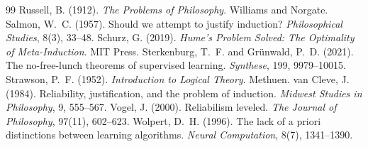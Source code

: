 \documentclass{situationist-preprint}
\begin{document}
\begin{thebibliography}{99}
 Russell, B. (1912). \emph{The Problems of Philosophy}. Williams and Norgate.
 Salmon, W.~C. (1957). Should we attempt to justify induction? \emph{Philosophical Studies}, 8(3), 33--48.
 Schurz, G. (2019). \emph{Hume's Problem Solved: The Optimality of Meta-Induction}. MIT Press.
 Sterkenburg, T.~F. and Grünwald, P.~D. (2021). The no-free-lunch theorems of supervised learning. \emph{Synthese}, 199, 9979--10015.
 Strawson, P.~F. (1952). \emph{Introduction to Logical Theory}. Methuen.
 van Cleve, J. (1984). Reliability, justification, and the problem of induction. \emph{Midwest Studies in Philosophy}, 9, 555--567.
 Vogel, J. (2000). Reliabilism leveled. \emph{The Journal of Philosophy}, 97(11), 602--623.
 Wolpert, D.~H. (1996). The lack of a priori distinctions between learning algorithms. \emph{Neural Computation}, 8(7), 1341--1390.
\end{thebibliography}
\end{document}
